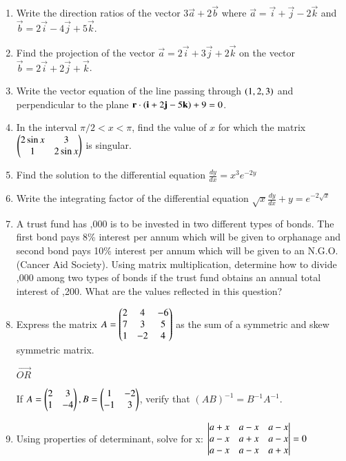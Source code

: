 \documentclass[journal,12pt,twocolumn]{IEEEtran}
\theoremstyle{remark}
\begin{document}
\begin{enumerate}
\item Write the direction ratios of the vector $3\vec{a}+2\vec{b}$ where $\vec{a} = \vec{i}+\vec{j}-2\vec{k}$ and $\vec{b} = 2\vec{i}-4\vec{j}+5\vec{k}$. \\
\item Find the projection of the vector $\vec{a}=2\vec{i}+3\vec{j}+2\vec{k}$ on the vector $\vec{b}=2\vec{i}+2\vec{j}+\vec{k}$. \\
\item Write the vector equation of the line passing through $\left(1,2,3\right)$ and perpendicular to the plane $\mathbf{r}\cdot\left(\mathbf{i}+2\mathbf{j}-5\mathbf{k}\right)+9=0$. \\
\item In the interval ${\pi}/2<x<\pi$, find the value of $x$ for which the matrix $\begin{pmatrix}2\sin{x} & 3 \\ 1 & 2\sin{x}\end{pmatrix}$ is singular.\\
\item Find the solution to the differential equation 
$\frac{dy}{dx} = x^{3}e^{-2y}$
\item Write the integrating factor of the differential equation
$\sqrt{x}\frac{dy}{dx} + y = e^{-2\sqrt{x}}$ \\
\item A trust fund has ,000 is to be invested in two different types of bonds. The first bond pays 8\% interest per annum which will be given to orphanage and second bond pays 10\% interest per annum which will be given to an N.G.O. (Cancer Aid Society). Using matrix multiplication, determine how to divide ,000 among two types of bonds if the trust fund obtains an annual total interest of ,200. What are the values reflected in this question? \\
\item Express the matrix $A = \begin{pmatrix}2&4&-6\\7&3&5\\1&-2&4\end{pmatrix}$ as the sum of a symmetric and skew symmetric matrix.
\begin{center} $\vec{OR}$ \\ \end{center}
If $A = \begin{pmatrix}2&3\\1&-4\end{pmatrix}, B = \begin{pmatrix}1&-2\\-1&3\end{pmatrix}$, verify that $(AB)^{-1} = B^{-1}A^{-1}$. \\
\item Using properties of determinant, solve for x:
$\begin{vmatrix}a+x & a-x & a-x \\ a-x & a+x & a-x \\ a-x & a-x & a+x\end{vmatrix} = 0$ \\

\end{enumerate}
\end{document}
